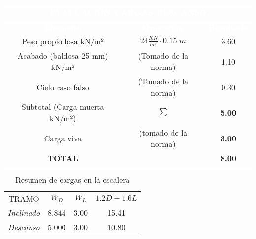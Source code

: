 \documentclass[12pt]{article}
\begin{document}
\begin{table}[H]
\centering

\begin{tabular}{|c|c|c|} 
\hline
\multicolumn{3}{|c|}{{\cellcolor[rgb]{ .2,  .247,  .31}}\textcolor{white}{\textbf{EVALUACIÓN CARGAS DESCANSO}}}                                        \\ 
\hline
\rowcolor[rgb]{ .2,  .247,  .31} \textcolor{white}{\textbf{Elemento}} & \textcolor{white}{\textbf{Operación}} & \textcolor{white}{\textbf{Resultado}}  \\ 
\hline
{\cellcolor[rgb]{1,1,1}}Peso propio losa
  kN/m²        & $24\tfrac{KN}{m^3} \cdot 0.15\;m$                                     & 3.60                                   \\ 
\hline
{\cellcolor[rgb]{1,1,1}}Acabado (baldosa 25
  mm) kN/m² & (Tomado de la norma)                                     & 1.10                                   \\ 
\hline
{\cellcolor[rgb]{1,1,1}}Cielo raso falso                    & (Tomado de la norma)                                       & 0.30                                   \\ 
\hline
{\cellcolor[rgb]{1,1,1}}Subtotal (Carga
  muerta kN/m²) & $\mathbf{\sum}$                                     & \textbf{5.00 }                                  \\ 
\hline
{\cellcolor[rgb]{1,1,1}}Carga viva                      & (tomado de la norma)                                     & \textbf{3.00  }                                 \\ 
\hline
{\cellcolor[rgb]{1,1,1}}\textbf{TOTAL}                  & ~                                     & \textbf{8.00   }                                \\
\hline
\end{tabular}
\end{table}

\begin{table}[H]
  \centering
      \begin{tabular}{|c|c|c|c|}
    \hline
    \rowcolor[rgb]{ .651,  .651,  .651} \multicolumn{4}{|c|}{\textbf{RESUMEN }} \bigstrut\\
    \hline
    \rowcolor[rgb]{ .851,  .851,  .851} TRAMO & $W_{D}$ & $W_{L}$ & $1.2D+1.6L$ \bigstrut\\
    \hline
    \textit{Inclinado} & 8.844 & 3.00 & 15.41 \bigstrut\\
    \hline
    \textit{Descanso} & 5.000 & 3.00 & 10.80 \bigstrut\\
    \hline
    \end{tabular}%
     \caption{Resumen de cargas en la escalera}
  \label{tab:cargasescalera}%
\end{table}%
\end{document}
